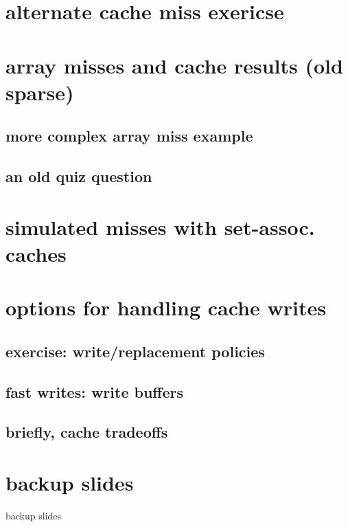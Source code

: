 \section{alternate cache miss exericse}


\section{array misses and cache results (old sparse)}


\subsection{more complex array miss example}


\subsection{an old quiz question}


\section{simulated misses with set-assoc. caches}


\section{options for handling cache writes}


\subsection{exercise: write/replacement policies}


\subsection{fast writes: write buffers}


\subsection{briefly, cache tradeoffs}


\section{backup slides}
\begin{frame}{backup slides}
\end{frame}


